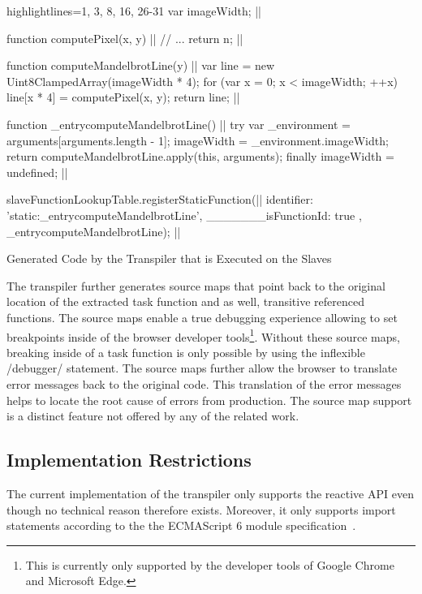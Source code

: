 \begin{listing}
\begin{javascriptcode*}{highlightlines={1, 3, 8, 16, 26-31}}
var imageWidth; |$\label{code:slave-image-width}$|

function computePixel(x, y) { |$\label{code:slave-compute-pixel-start}$|
	// ...
	return n;
}|$\label{code:slave-compute-pixel-end}$|

function computeMandelbrotLine(y) { |$\label{code:slave-task function-start}$|
	var line = new Uint8ClampedArray(imageWidth * 4);
	for (var x = 0; x < imageWidth; ++x) {
		line[x * 4] = computePixel(x, y);
	}
	return line;
}|$\label{code:slave-task function-end}$|
 
function _entrycomputeMandelbrotLine() { |$\label{code:slave-entry-function-start}$|
	try {
		var _environment = arguments[arguments.length - 1];
		imageWidth = _environment.imageWidth;
		return computeMandelbrotLine.apply(this, arguments);
	} finally {
		imageWidth = undefined;
	}
} |$\label{code:slave-entry-function-end}$|

slaveFunctionLookupTable.registerStaticFunction({|$\label{code:slave-register-function-start}$|
		identifier: 'static:_entrycomputeMandelbrotLine',
		_______isFunctionId: true
	}, _entrycomputeMandelbrotLine); |$\label{code:slave-register-function-end}$|
\end{javascriptcode*}
\caption{Generated Code by the Transpiler that is Executed on the Slaves}
\label{fig:transpiled-mandelbrot-slave}
\end{listing}

The transpiler further generates source maps that point back to the original location of the extracted task function and as well, transitive referenced functions. The source maps enable a true debugging experience allowing to set breakpoints inside of the browser developer tools\footnote{This is currently only supported by the developer tools of Google Chrome and Microsoft Edge.}. Without these source maps, breaking inside of a task function is only possible by using the inflexible \javascriptinline/debugger/ statement. The source maps further allow the browser to translate error messages back to the original code. This translation of the error messages helps to locate the root cause of errors from production. The source map support is a distinct feature not offered by any of the related work.

\subsection{Implementation Restrictions}
The current implementation of the transpiler only supports the reactive API even though no technical reason therefore exists. Moreover, it only supports import statements according to the the ECMAScript 6 module specification~\cite[Section 15.2]{ecmaScript2015}.
